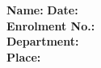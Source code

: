 \begin{declaration}
	\vspace{1cm}
	\flushleft
	\textbf{Name:} \authorname \hfill \textbf{Date:} \tdate \\
	\textbf{Enrolment No.:} \enrollno \\
	\textbf{Department:} \deptname \\ %
	\textbf{Place:} \place %
	
	
\end{declaration}

